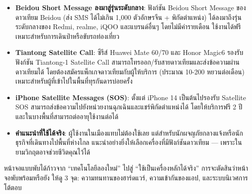 \begin{itemize}
  \item \textbf{Beidou Short Message ลงมาสู่รุ่นระดับกลาง}: ฟังก์ชัน Beidou Short Message ของดาวเทียม Beidou (ส่ง SMS ได้ไม่เกิน 1,000 ตัวอักษรจีน + พิกัดตำแหน่ง) ได้ลงมาถึงรุ่นระดับกลางของ Redmi, realme, iQOO และแบรนด์อื่นๆ โดยไม่มีค่ารายเดือน ใช้งานได้ฟรี เหมาะสำหรับการเดินป่าหรือขับรถท่องเที่ยว
  \item \textbf{Tiantong Satellite Call}: ซีรีส์ Huawei Mate 60/70 และ Honor Magic6 รองรับฟังก์ชัน Tiantong-1 Satellite Call สามารถโทรออก/รับสายดาวเทียมและส่งข้อความผ่านดาวเทียมได้ โดยต้องสมัครแพ็กเกจดาวเทียมกับผู้ให้บริการ (ประมาณ 10-200 หยวนต่อเดือน) เหมาะสำหรับผู้ที่เข้าไปในพื้นที่ทุรกันดารบ่อยครั้ง
  \item \textbf{iPhone Satellite Messages (SOS)}: ตั้งแต่ iPhone 14 เป็นต้นไปรองรับ Satellite SOS สามารถส่งข้อความไปยังหน่วยงานฉุกเฉินและแชร์พิกัดตำแหน่งได้ โดยให้บริการฟรี 2 ปี และในบางพื้นที่สามารถต่ออายุใช้งานต่อได้
  \item \textbf{คำแนะนำที่ใช้ได้จริง}: ผู้ใช้งานในเมืองแทบไม่ต้องใช้เลย แต่สำหรับนักผจญภัยกลางแจ้งหรือนักธุรกิจที่เดินทางไปพื้นที่ห่างไกล แนะนำอย่างยิ่งให้เลือกเครื่องที่มีฟังก์ชันดาวเทียม — เพราะในยามวิกฤตอาจช่วยชีวิตคุณไว้ได้
\end{itemize}


หน้าจอแบบพับได้ก้าวจาก “เทคโนโลยีลองใหม่” ไปสู่ “ใช้เป็นเครื่องหลักได้จริง” การจะตัดสินว่าหน้าจอพับพร้อมหรือยัง ให้ดู 3 จุด: ความทนทานของฮาร์ดแวร์, ความเข้ากันของแอป, และระบบนิเวศการโต้ตอบ

